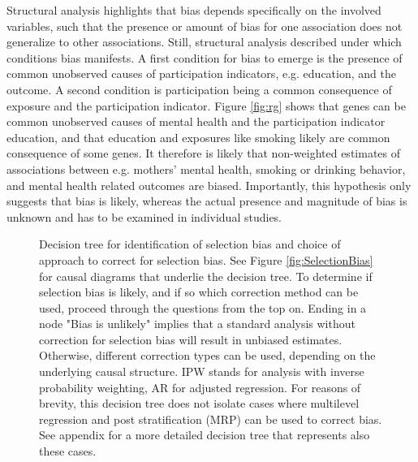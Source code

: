 \documentclass[]{article}
\begin{document}
Structural analysis highlights that bias depends specifically on the involved variables, such that the presence or amount of bias for one association does not generalize to other associations. Still, structural analysis described under which conditions bias manifests. A first condition for bias to emerge is the presence of common unobserved causes of participation indicators, e.g. education, and the outcome. A second condition is  participation being a common consequence of exposure and the participation indicator. Figure \ref{fig:rg} shows that genes can be common unobserved causes of mental health and the participation indicator education, and that education and exposures like smoking likely are common consequence of some genes. It therefore is likely that non-weighted estimates of associations between e.g. mothers' mental health, smoking or drinking behavior, and mental health related outcomes are biased. Importantly, this hypothesis only suggests that bias is likely, whereas the actual presence and magnitude of bias is unknown and has to be examined in individual studies. 

\begin{figure}
	\centering
	\begin{singlespace}
			
	\end{singlespace}
	
	\caption{Decision tree for identification of selection bias and choice of approach to correct for selection bias. See Figure \ref{fig:SelectionBias} for causal diagrams that underlie the decision tree. 
	To determine if selection bias is likely, and if so which correction method can be used, proceed through the questions from the top on. Ending in a node "Bias is unlikely" implies that a standard analysis without correction for selection bias will result in unbiased estimates. Otherwise, different correction types can be used, depending on the underlying causal structure. IPW stands for analysis with inverse probability weighting, AR for adjusted regression. For reasons of brevity, this decision tree does not isolate cases where multilevel regression and post stratification (MRP) can be used to correct bias. See appendix for a more detailed decision tree that represents also these cases.}
	\label{fig:DecisionTree}
\end{figure}
\end{document}
